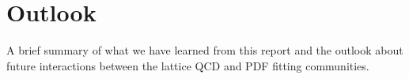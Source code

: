 \section{Outlook}

A brief summary of what we have learned from this report
and the outlook about future interactions between the lattice
QCD and PDF fitting communities.

